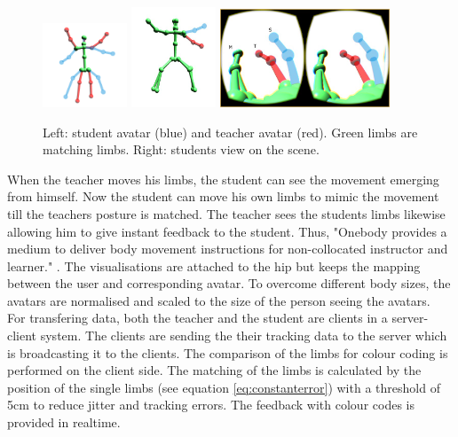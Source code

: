 \begin{figure}
	\centering
	\includegraphics[width=0.225\textwidth]{img/onebody1.png}
	\includegraphics[width=0.225\textwidth]{img/onebody2.png}
	\includegraphics[width=0.45\textwidth]{img/onebody3.png}
	\caption{Left: student avatar (blue) and teacher avatar (red). Green limbs are matching limbs. Right: students view on the scene.\todo}
	\label{fig:ob1}
\end{figure}
When the teacher moves his limbs, the student can see the movement emerging from himself. Now the student can move his own limbs to mimic the movement till the teachers posture is matched. The teacher sees the students limbs likewise allowing him to give instant feedback to the student. Thus, "Onebody provides a medium to deliver body movement instructions for non-collocated instructor and learner." \todo. The visualisations are attached to the hip but keeps the mapping between the user and corresponding avatar. To overcome different body sizes, the avatars are normalised and scaled to the size of the person seeing the avatars.\\
For transfering data, both the teacher and the student are clients in a server-client system. The clients are sending the their tracking data to the server which is broadcasting it to the clients. The comparison of the limbs for colour coding is performed on the client side. The matching of the limbs is calculated by the position of the single limbs (see equation \eqref{eq:constanterror}) with a threshold of 5cm to reduce jitter and tracking errors. The feedback with colour codes is provided in realtime.

